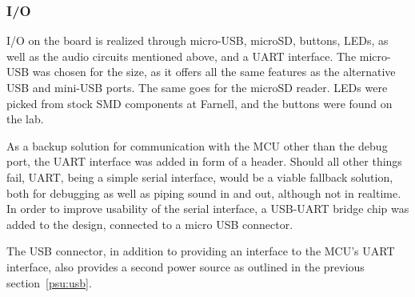 
\subsubsection{I/O}

I/O on the board is realized through micro-USB, microSD, buttons, LEDs, as
well as the audio circuits mentioned above, and a UART interface. The micro-USB was chosen for the
size, as it offers all the same features as the alternative USB and mini-USB ports. The same goes for the
microSD reader. LEDs were picked from stock SMD components at Farnell, and the
buttons were found on the lab.

As a backup solution for communication with the MCU other than the debug port,
the UART interface was added in form of a header. Should all other things fail,
UART, being a simple serial interface, would be a viable fallback solution, both
for debugging as well as piping sound in and out, although not in realtime. In
order to improve usability of the serial interface, a USB-UART bridge chip was
added to the design, connected to a micro USB connector.

The USB connector, in addition to providing an interface to the MCU's UART
interface, also provides a second power source as outlined in
the previous section~\ref{psu:usb}.
